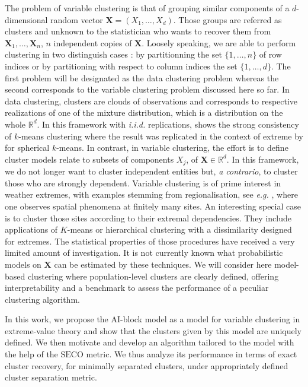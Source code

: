 \documentclass[11pt]{article}
\newcommand{\SECO}{\mathrm{SECO}}
\begin{document}
	The problem of variable clustering is that of grouping similar components of a $d$-dimensional random vector $\textbf{X} = (X_1,\dots,X_d)$. Those groups are referred as clusters and unknown to the statistician who wants to recover them from $\textbf{X}_1, \dots, \textbf{X}_n$, $n$ independent copies of $\textbf{X}$. Loosely speaking, we are able to perform clustering in two distinguish cases : by partitionning the set $\{1,\dots, n\}$ of row indices or by partitioning with respect to column indices the set $\{1,\dots,d\}$. The first problem will be designated as the data clustering problem whereas the second corresponds to the variable clustering problem discussed here so far. In data clustering, clusters are clouds of observations and corresponds to respective realizations of one of the mixture distribution, which is a distribution on the whole $\mathbb{R}^d$. In this framework with \emph{i.i.d.} replications, \cite{pollard1981strong} shows the strong consistency of $k$-means clustering where the result was replicated in the context of extreme by \cite{janssen2020k} for spherical $k$-means. In contrast, in variable clustering, the effort is to define cluster models relate to subsets of components $X_j$, of $\textbf{X} \in \mathbb{R}^d$. In this framework, we do not longer want to cluster independent entities but, \emph{a contrario}, to cluster those who are strongly dependent. Variable clustering is of prime interest in weather extremes, with examples stemming from regionalisation, see \emph{e.g.} \cite{bernard2013clustering,bador2015spatial, saunders2021regionalisation}, where one observes spatial phenomena at finitely many sites. An interesting special case is to cluster those sites according to their extremal dependencies. They include applications of $K$-means or hierarchical clustering with a dissimilarity designed for extremes. The statistical properties of those procedures have received a very limited amount of investigation. It is not currently known what probabilistic models on $\textbf{X}$ can be estimated by these techniques. We will consider here model-based clustering where population-level clusters are clearly defined, offering interpretability and a benchmark to assess the performance of a peculiar clustering algorithm.
	
	In this work, we propose the AI-block model as a model for variable clustering in extreme-value theory and show that the clusters given by this model are uniquely defined. We then motivate and develop an algorithm tailored to the model with the help of the $\SECO$ metric. We thus analyze its performance in terms of exact cluster recovery, for minimally separated clusters, under appropriately defined cluster separation metric.
	
\end{document}
